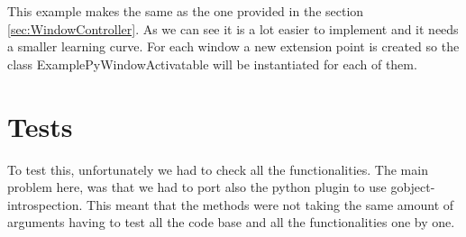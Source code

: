 This example makes the same as the one provided in the section \ref{sec:WindowController}. As we can see it is a lot easier to implement and it needs a smaller learning curve. For each window a new extension point is created so the class ExamplePyWindowActivatable will be instantiated for each of them.

\section{Tests}

To test this, unfortunately we had to check all the functionalities. The main problem here, was that we had to port also the python plugin to use gobject-introspection. This meant that the methods were not taking the same amount of arguments having to test all the code base and all the functionalities one by one.

